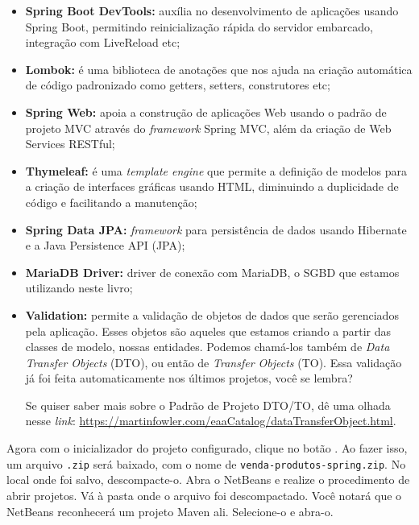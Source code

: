 \begin{itemize}

    \item \textbf{Spring Boot DevTools:} auxília no desenvolvimento de aplicações usando Spring Boot, permitindo reinicialização rápida do servidor embarcado, integração com LiveReload etc;
    
    \item \textbf{Lombok:} é uma biblioteca de anotações que nos ajuda na criação automática de código padronizado como getters, setters, construtores etc;
    
    \item \textbf{Spring Web:} apoia a construção de aplicações Web usando o padrão de projeto MVC através do \textit{framework} Spring MVC, além da criação de Web Services RESTful;
    
    \item \textbf{Thymeleaf:} é uma \textit{template engine} que permite a definição de modelos para a criação de interfaces gráficas usando HTML, diminuindo a duplicidade de código e facilitando a manutenção;
    
    \item \textbf{Spring Data JPA:} \textit{framework} para persistência de dados usando Hibernate e a Java Persistence API (JPA);
    
    \item \textbf{MariaDB Driver:} driver de conexão com MariaDB, o SGBD que estamos utilizando neste livro;
    
    \item \textbf{Validation:} permite a validação de objetos de dados que serão gerenciados pela aplicação. Esses objetos são aqueles que estamos criando a partir das classes de modelo, nossas entidades. Podemos chamá-los também de \textit{Data Transfer Objects} (DTO), ou então de \textit{Transfer Objects} (TO). Essa validação já foi feita automaticamente nos últimos projetos, você se lembra?
    
    \begin{saibaMais}
        Se quiser saber mais sobre o Padrão de Projeto DTO/TO, dê uma olhada nesse \textit{link}: \url{https://martinfowler.com/eaaCatalog/dataTransferObject.html}.
    \end{saibaMais}
    
\end{itemize}

Agora com o inicializador do projeto configurado, clique no botão . Ao fazer isso, um arquivo \texttt{.zip} será baixado, com o nome de \texttt{venda-produtos-spring.zip}. No local onde foi salvo, descompacte-o. Abra o NetBeans e realize o procedimento de abrir projetos. Vá à pasta onde o arquivo foi descompactado. Você notará que o NetBeans reconhecerá um projeto Maven ali. Selecione-o e abra-o.


